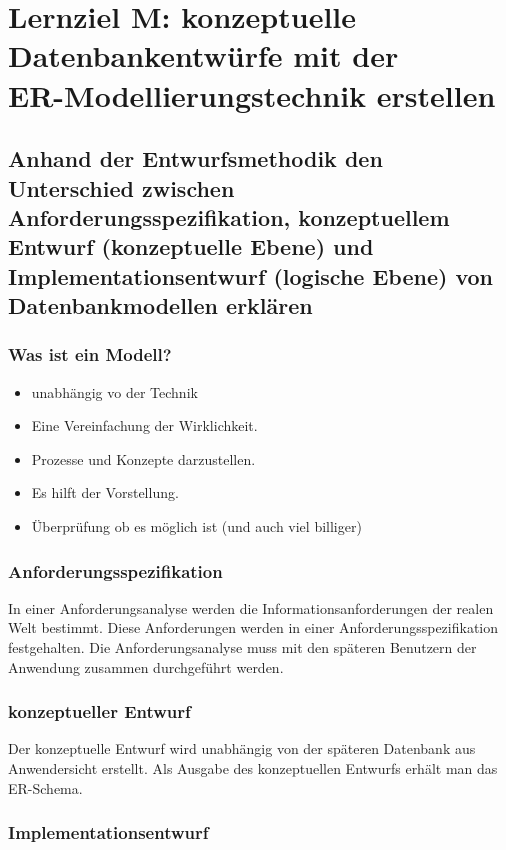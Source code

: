 \section{Lernziel M: konzeptuelle Datenbankentwürfe mit der \\ ER-Modellierungstechnik erstellen}

\subsection{Anhand der Entwurfsmethodik den Unterschied zwischen
Anforderungsspezifikation, konzeptuellem Entwurf (konzeptuelle Ebene)
und Implementationsentwurf (logische Ebene) von Datenbankmodellen
erklären}
\subsubsection{Was ist ein Modell?}
\begin{itemize}
\item unabhängig vo der Technik
\item Eine Vereinfachung der Wirklichkeit. 
\item Prozesse und Konzepte darzustellen. 
\item Es hilft der Vorstellung. 
\item Überprüfung ob es möglich ist (und auch viel billiger) 
\end{itemize}
\subsubsection{Anforderungsspezifikation}

In einer Anforderungsanalyse werden die Informationsanforderungen der realen Welt bestimmt. Diese Anforderungen werden in einer Anforderungsspezifikation festgehalten. Die Anforderungsanalyse muss mit den späteren Benutzern der Anwendung zusammen durchgeführt werden.

\subsubsection{konzeptueller Entwurf}

Der konzeptuelle Entwurf wird unabhängig von der späteren Datenbank aus Anwendersicht erstellt. Als Ausgabe des konzeptuellen Entwurfs erhält man das ER-Schema.

\subsubsection{Implementationsentwurf}

